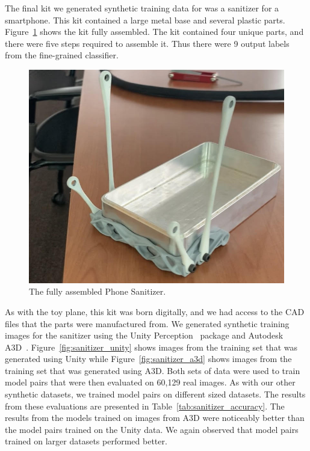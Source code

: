 The final kit we generated synthetic training data for was a sanitizer for a
smartphone.
This kit contained a large metal base and several plastic parts.
Figure~\ref{fig:full_sanitizer} shows the kit fully assembled.
The kit contained four unique parts, and there were five steps required to
assemble it.
Thus there were 9 output labels from the fine-grained classifier.

\begin{figure}
  \includegraphics[width=\columnwidth]{figures/synthetic/full_sanitizer.jpg}
  \caption{
    The fully assembled Phone Sanitizer.
  }\label{fig:full_sanitizer}
\end{figure}

As with the toy plane, this kit was born digitally, and we had access to the
CAD files that the parts were manufactured from.
We generated synthetic training images for the sanitizer using the Unity
Perception~\cite{unity} package and Autodesk A3D~\cite{Wang_2022_CVPR}.
Figure~\ref{fig:sanitizer_unity} shows images from the training set that was
generated using Unity while Figure~\ref{fig:sanitizer_a3d}
shows images from the training set that was generated using
A3D.
Both sets of data were used to train model pairs that were then evaluated on
60,129 real images.
As with our other synthetic datasets, we trained model pairs on different sized
datasets.
The results from these evaluations are presented in
Table~\ref{tab:sanitizer_accuracy}.
The results from the models trained on images from A3D were noticeably better
than the model pairs trained on the Unity data.
We again observed that model pairs trained on larger datasets performed better.


